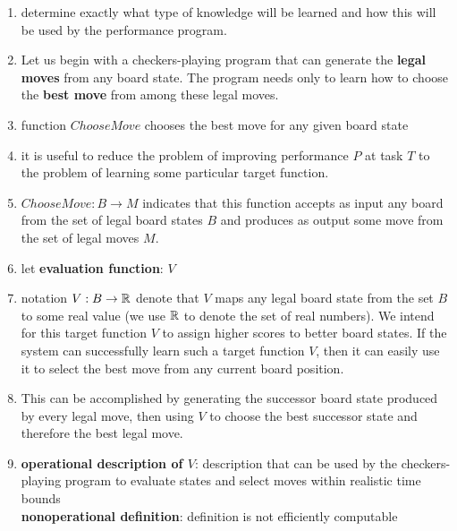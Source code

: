 \begin{enumerate}
    \item determine exactly what type of knowledge will be learned and how this will be used by the performance program.
    \hfill \cite{ml/book/Machine-Learning/Tom-M-Mitchell}

    \item Let us begin with a checkers-playing program that can generate the \textbf{legal moves} from any board state. The program needs only to learn how to choose the \textbf{best move} from among these legal moves.
    \hfill \cite{ml/book/Machine-Learning/Tom-M-Mitchell}

    \item function $ChooseMove$ chooses the best move for any given board state
    \hfill \cite{ml/book/Machine-Learning/Tom-M-Mitchell}

    \item it is useful to reduce the problem of improving performance $P$ at task $T$ to the problem of learning some particular target function.
    \hfill \cite{ml/book/Machine-Learning/Tom-M-Mitchell}

    \item $ChooseMove : B \to M$ indicates that this function accepts as input any board from the set of legal board states $B$ and produces as output some move from the set of legal moves $M$.
    \hfill \cite{ml/book/Machine-Learning/Tom-M-Mitchell}

    \item let \textbf{evaluation function}: $V$
    \hfill \cite{ml/book/Machine-Learning/Tom-M-Mitchell}

    \item notation $V : B \to \mathbb{R}$ denote that $V$ maps any legal board state from the set $B$ to some real value (we use $\mathbb{R}$ to denote the set of real numbers). We intend for this target function $V$ to assign higher scores to better board states. If the system can successfully learn such a target function $V$, then it can easily use it to select the best move from any current board position.
    \hfill \cite{ml/book/Machine-Learning/Tom-M-Mitchell}

    \item This can be accomplished by generating the successor board state produced by every legal move, then using $V$ to choose the best successor state and therefore the best legal move. 
    \hfill \cite{ml/book/Machine-Learning/Tom-M-Mitchell}

    \item \textbf{operational description of $V$}: description that can be used by the checkers-playing program to evaluate states and select moves within realistic time bounds
    \hfill \cite{ml/book/Machine-Learning/Tom-M-Mitchell}
    \\
    \textbf{nonoperational definition}: definition is not efficiently computable
    \hfill \cite{ml/book/Machine-Learning/Tom-M-Mitchell}


\end{enumerate}
